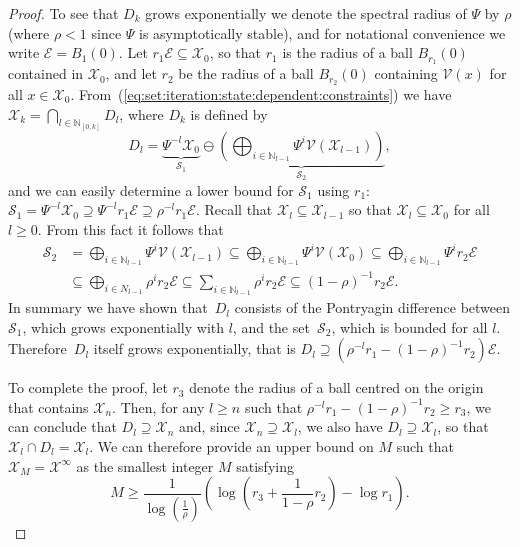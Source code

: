 \documentclass[journal]{IEEEtran}
\theoremstyle{remark}
\theoremstyle{definition}
\begin{document}
\begin{proof}
To see that $D_k$ grows exponentially we denote the spectral radius of $\Psi$ by $\rho$ (where $\rho<1$ since $\Psi$ is asymptotically stable), and 
%
for notational convenience we write $\mathcal E=B_1(0)$. Let
$r_1\mathcal E \subseteq\mathcal X_0$,
so that $r_1$ is the radius of a ball $B_{r_1}(0)$ contained in $\mathcal X_0$, 
and let $r_2$ be the radius of a ball $B_{r_2}(0)$ containing $\mathcal V(x)$ for all $x\in\mathcal X_0$.
%
From~(\ref{eq:set:iteration:state:dependent:constraints}) we have
$\mathcal X_k = \bigcap_{l\in \mathbb N_{[0,k]}} D_l$, where $D_k$ is defined by
%
\begin{equation}
  D_l = \underbrace{\Psi^{-l}\mathcal X_0}_{\mathcal S_1} \ominus 
  \underbrace{\left(\bigoplus_{ i \in \mathbb N_{l-1}} \Psi^{i}\mathcal V(\mathcal X_{l-1})\right)}_{\mathcal S_2} ,
\end{equation}
%
and we can easily determine a lower bound for $\mathcal S_1$ using $r_1$: $\mathcal S_1 = \Psi^{-l}\mathcal X_0 
\supseteq \Psi^{-l} r_1\mathcal E \supseteq \rho^{-l} r_1 \mathcal E$.
%
Recall that $\mathcal X_l\subseteq\mathcal X_{l-1}$ so that $\mathcal X_l\subseteq\mathcal X_0$ for all $l\geq0$.
%
From this fact it follows that 
\begin{align*}
\mathcal S_2 &= \bigoplus_{i\in\mathbb N_{l-1}}
\Psi^{i}\mathcal V(\mathcal X_{l-1})
\subseteq \bigoplus_{i\in \mathbb N_{l-1}} \Psi^{i}\mathcal V(\mathcal X_0)
\subseteq
\bigoplus_{i\in \mathbb N_{l-1}} \Psi^{i} r_2 \mathcal E \\
&\subseteq\bigoplus_{i\in N_{l-1}} \rho^{i} r_2\mathcal E\subseteq
\sum_{i\in\mathbb N_{l-1}}\rho^i r_2 \mathcal E\subseteq (1-\rho)^{-1}r_2\mathcal E.
\end{align*}
%
In summary we have shown that~$D_l$ consists of the Pontryagin difference between $\mathcal S_1$, which grows exponentially with $l$, and the set~$\mathcal S_2$, which is bounded for all $l$. Therefore~$D_l$ itself grows exponentially,
that is $D_l\supseteq(\rho^{-l} r_1 - (1-\rho)^{-1} r_2)\mathcal E$.
%

To complete the proof, let $r_3$ denote the radius of a ball centred on the origin that contains $\mathcal X_n$.
%
Then, for any $l\geq n$ such that %
$\rho^{-l} r_1 - (1-\rho)^{-1} r_2 \geq r_3$, 
we can conclude that $D_l\supseteq \mathcal X_n$ and, since $\mathcal X_n \supseteq \mathcal X_l$, we also have $D_l\supseteq \mathcal X_l$, so that 
$\mathcal X_l \cap D_l = \mathcal X_l$.
%
We can therefore provide an upper bound on $M$ such that $\mathcal X_M = \mathcal X^\infty$ as the smallest integer $M$ satisfying
\begin{equation}\label{bnd:first:lower:bound:on:iteration:count}
  M\geq \frac{1}{\log(\frac{1}{\rho})}\left(\log\left(r_3+\frac{1}{1-\rho}r_2\right)-\log r_1 \right) .
\end{equation}
\end{proof}
\end{document}
